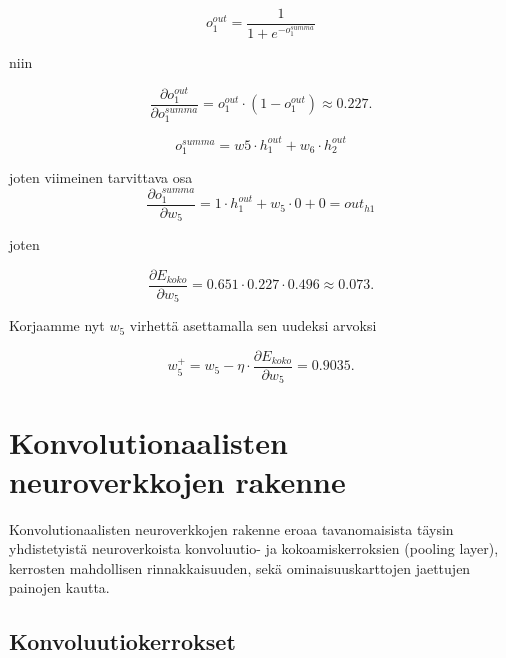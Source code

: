 \documentclass[finnish]{tktltiki2}
\theoremstyle{definition}
\theoremstyle{remark}
\begin{document}
  $$ o_{1}^{out} = \frac{1}{1+e^{-o_1^{summa}}} $$
  
  niin

  $$ \frac{\partial o_{1}^{out}}{\partial o_1^{summa}} = o_{1}^{out} \cdot (1 - o_{1}^{out}) \approx 0.227.$$

  $$ o_1^{summa} = w5 \cdot h_{1}^{out} + w_6 \cdot h_{2}^{out} $$
  
  joten viimeinen tarvittava osa 
  $$ \frac{\partial o_1^{summa}}{\partial w_5} = 1 \cdot h_{1}^{out} + w_5 \cdot 0 + 0 = out_{h1} $$ 

  joten 
  
  $$\frac{\partial E_{koko}}{\partial w_5} = 0.651 \cdot 0.227 \cdot 0.496 \approx 0.073. $$

   Korjaamme nyt $w_5$ virhettä asettamalla sen uudeksi arvoksi

  $$w_{5}^+ = w_5 - \eta \cdot \frac{\partial E_{koko}}{\partial w_5} = 0.9035.$$





  
  \section{Konvolutionaalisten neuroverkkojen rakenne}
    Konvolutionaalisten neuroverkkojen rakenne eroaa tavanomaisista täysin yhdistetyistä neuroverkoista konvoluutio- ja kokoamiskerroksien (pooling layer), kerrosten mahdollisen rinnakkaisuuden, sekä ominaisuuskarttojen jaettujen painojen kautta.   
    

    \subsection{Konvoluutiokerrokset}
    \label{chap:convolutional-layers}
\end{document}
